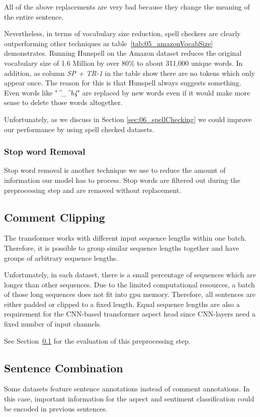 All of the above replacements are very bad because they change the meaning of the entire sentence.

Nevertheless, in terms of vocabulary size reduction, spell checkers are clearly outperforming other techniques as table~\ref{tab:05_amazonVocabSize} demonstrates. Running Hunspell on the Amazon dataset reduces the original vocabulary size of 1.6 Million by over 80\% to about 311,000 unique words. In addition, as column \textit{SP + TR-1} in the table show there are no tokens which only appear once. The reason for this is that Hunspell always suggests something. Even words like "\textit{\^{}\_\^{}b4}" are replaced by new words even if it would make more sense to delete those words altogether.
\medskip

Unfortunately, as we discuss in Section \ref{sec:06_spellChecking} we could improve our performance by using spell checked datasets.

\subsubsection*{Stop word Removal}

Stop word removal is another technique we use to reduce the amount of information our model has to process. Stop words are filtered out during the preprocessing step and are removed without replacement.

\subsection{Comment Clipping}
\label{subsec:06_CommentClipping}

The transformer works with different input sequence lengths within one batch. Therefore, it is possible to group similar sequence lengths together and have groups of arbitrary sequence lengths. 

Unfortunately, in each dataset, there is a small percentage of sequences which are longer than other sequences. Due to the limited computational resources, a batch of those long sequences does not fit into \gls{gpu} memory. Therefore, all sentences are either padded or clipped to a fixed length. Equal sequence lengths are also a requirement for the CNN-based transformer aspect head since CNN-layers need a fixed number of input channels.

See Section~\ref{subsec:06_CommentClipping} for the evaluation of this preprocessing step.


\subsection{Sentence Combination}
\label{sec:05_sentenceCombination}
Some datasets feature sentence annotations instead of comment annotations. In this case, important information for the aspect and sentiment classification could be encoded in previous sentences.
\medskip

